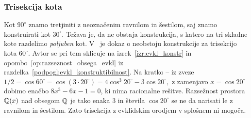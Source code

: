 
\subsubsection{Trisekcija kota}
\label{podpogl:trisekcija}

Kot $90^\circ$ znamo tretjiniti z neoznačenim ravnilom in šestilom, saj znamo konstruirati kot $30^\circ$. Težava je, da ne obstaja konstrukcija, s katero na tri skladne kote razdelimo \emph{poljuben} kot. V~\cite[str.\ 77--78]{jerman1998} je dokaz o neobstoju konstrukcije za trisekcijo kota $60^\circ$. Avtor se pri tem sklicuje na izrek~\ref{izr:evkl_konstr} in opombo~\ref{op:razseznost_obsega_evkl} iz razdelka~\ref{podpogl:evkl_konstruktibilnost}. Na kratko -- iz zveze $ 1/2 = \cos 60^\circ = \cos(3 \cdot 20^\circ) = 4 \cos^3 20^\circ - 3 \cos 20^\circ, $ z zamenjavo $x = \cos 20^\circ$ dobimo enačbo $8 x^3 - 6x - 1 = 0$, ki nima racionalne rešitve. Razsežnost prostora $\mathbb Q(x)$ nad obsegom $\mathbb Q$ je tako enaka $3$ in števila $ \cos 20^\circ $ se ne da narisati le z ravnilom in šestilom. Zato trisekcija z evklidskim orodjem v splošnem ni mogoča.





